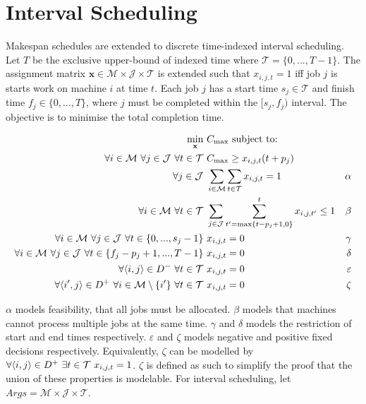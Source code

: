 \section{Interval Scheduling}

Makespan schedules are extended to discrete time-indexed interval scheduling. Let $T$ be the exclusive upper-bound of indexed time where $\mathcal{T}=\{0,...,T-1\}$. The assignment matrix $\mathbf{x}\in\mathcal{M}\times\mathcal{J}\times\mathcal{T}$ is extended such that $x_{i,j,t}=1$ iff job $j$ is starts work on machine $i$ at time $t$. Each job $j$ has a start time $s_j\in\mathcal{T}$ and finish time $f_j\in\{0,...,T\}$, where $j$ must be completed within the $[s_j,f_j)$ interval. The objective is to minimise the total completion time.

\begin{align*}
	\min_{\mathbf{x}}\ &C_{\max}\text{ subject to:}\\
	\forall i\in\mathcal{M}\ \forall j\in\mathcal{J}\ \forall t\in\mathcal{T}\ &C_{\max}\geq x_{i,j,t}(t+p_j)\\
	\forall j\in\mathcal{J}\ &\sum_{i\in\mathcal{M}}\sum_{t\in\mathcal{T}}x_{i,j,t}=1&\alpha\\
	\forall i\in\mathcal{M}\ \forall t\in\mathcal{T}\ &\sum_{j\in\mathcal{J}}\sum_{t'=\max\{t-p_j+1,0\}}^t x_{i,j,t'}\leq 1&\beta\\
	\forall i\in\mathcal{M}\ \forall j\in\mathcal{J}\ \forall t\in\{0,...,s_j-1\}\ &x_{i,j,t}=0&\gamma\\
	\forall i\in\mathcal{M}\ \forall j\in\mathcal{J}\ \forall t\in\{f_j-p_j+1,...,T-1\}\ &x_{i,j,t}=0&\delta\\
	\forall\pair{i}{j}\in D^-\ \forall t\in\mathcal{T}\ &x_{i,j,t}=0&\varepsilon\\
	\forall\pair{i'}{j}\in D^+\ \forall i\in\mathcal{M}\setminus\{i'\}\ \forall t\in\mathcal{T}\ &x_{i,j,t}=0&\zeta\\
\end{align*}

$\alpha$ models feasibility, that all jobs must be allocated. $\beta$ models that machines cannot process multiple jobs at the same time. $\gamma$ and $\delta$ models the restriction of start and end times respectively. $\varepsilon$ and $\zeta$ models negative and positive fixed decisions respectively. Equivalently, $\zeta$ can be modelled by $\forall\pair{i}{j}\in D^+\ \exists t\in\mathcal{T}\ x_{i,j,t}=1$. $\zeta$ is defined as such to simplify the proof that the union of these properties is modelable. For interval scheduling, let $Args=\mathcal{M}\times\mathcal{J}\times\mathcal{T}$.

